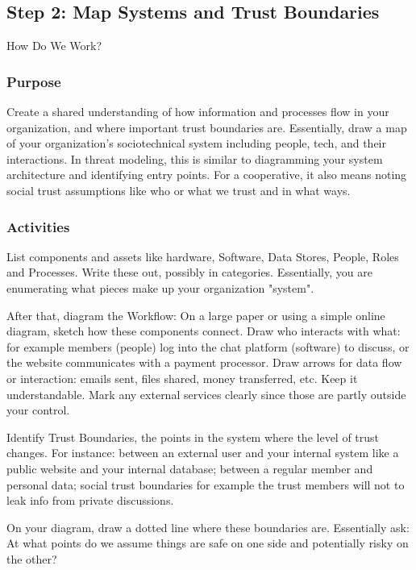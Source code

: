 \subsection{Step 2: Map Systems and Trust Boundaries}
\label{subsec:Step2}

How Do We Work?

\subsubsection{Purpose}

Create a shared understanding of how information and processes flow in your
organization, and where important trust boundaries are. Essentially, draw a map of your
organization's sociotechnical system including people, tech, and their
interactions. In threat modeling, this is similar to diagramming your system
architecture and identifying entry points. For a cooperative, it also means
noting social trust assumptions like who or what we trust and in what ways.

\subsubsection{Activities}

List components and assets like hardware, Software, Data Stores,
People, Roles and Processes. Write these out, possibly in categories.
Essentially, you are enumerating what pieces make up your organization "system".

After that, diagram the Workflow: On a large paper or using a simple online diagram,
sketch how these components connect. Draw who interacts with what:
for example members (people) log into the chat platform (software) to discuss,
or the website communicates with a payment processor. Draw arrows for data flow
or interaction: emails sent, files shared, money transferred, etc. Keep it
understandable. Mark any external services clearly since those are partly
outside your control.

Identify Trust Boundaries, the points in the system where the
level of trust changes. For instance: between an external user and your
internal system like a public website and your internal database; between
a regular member and personal data; social trust boundaries for example
the trust members will not to leak info from private discussions.

On your diagram, draw a dotted line where these boundaries are.
Essentially ask: At what points do we assume things are safe on one side
and potentially risky on the other?

